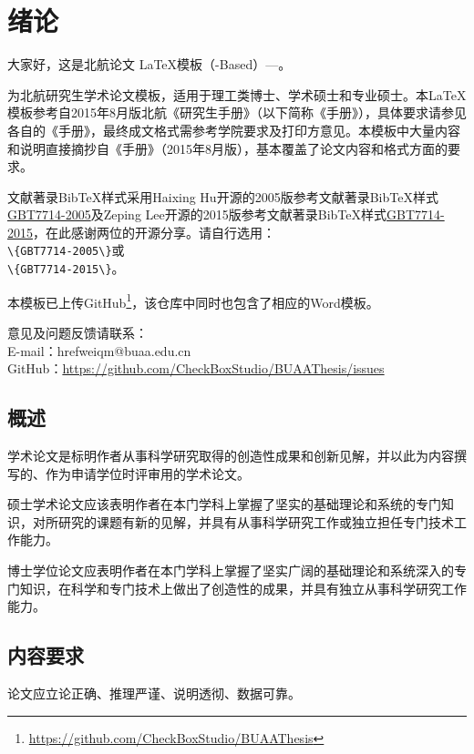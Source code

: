\chapter{绪论}

大家好，这是北航论文 \LaTeX 模板（\CTeX-Based）---\BUAAThesis 。

\BUAAThesis 为北航研究生学术论文模板，适用于理工类博士、学术硕士和专业硕士。本\LaTeX 模板参考自2015年8月版北航《研究生手册》（以下简称《手册》），具体要求请参见各自的《手册》，最终成文格式需参考学院要求及打印方意见。本模板中大量内容和说明直接摘抄自《手册》（2015年8月版），基本覆盖了论文内容和格式方面的要求。

文献著录BibTeX样式采用Haixing Hu开源的2005版参考文献著录BibTeX样式\href{https://github.com/Haixing-Hu/GBT7714-2005-BibTeX-Style}{GBT7714-2005}及Zeping Lee开源的2015版参考文献著录BibTeX样式\href{https://github.com/zepinglee/gbt7714-bibtex-style}{GBT7714-2015}，在此感谢两位的开源分享。请自行选用：\\
\verb|\{GBT7714-2005\}|或\\
\verb|\{GBT7714-2015\}|。



本模板已上传GitHub\footnote{\href{https://github.com/CheckBoxStudio/BUAAThesis}{https://github.com/CheckBoxStudio/BUAAThesis}}，该仓库中同时也包含了相应的Word模板。

意见及问题反馈请联系：\\
\indent E-mail：hrefweiqm@buaa.edu.cn\\
\indent GitHub：\href{https://github.com/CheckBoxStudio/BUAAThesis/issues}{https://github.com/CheckBoxStudio/BUAAThesis/issues}

\section{概述}
学术论文是标明作者从事科学研究取得的创造性成果和创新见解，并以此为内容撰写的、作为申请学位时评审用的学术论文。

硕士学术论文应该表明作者在本门学科上掌握了坚实的基础理论和系统的专门知识，对所研究的课题有新的见解，并具有从事科学研究工作或独立担任专门技术工作能力。

博士学位论文应表明作者在本门学科上掌握了坚实广阔的基础理论和系统深入的专门知识，在科学和专门技术上做出了创造性的成果，并具有独立从事科学研究工作能力。

\section{内容要求}
论文应立论正确、推理严谨、说明透彻、数据可靠。

